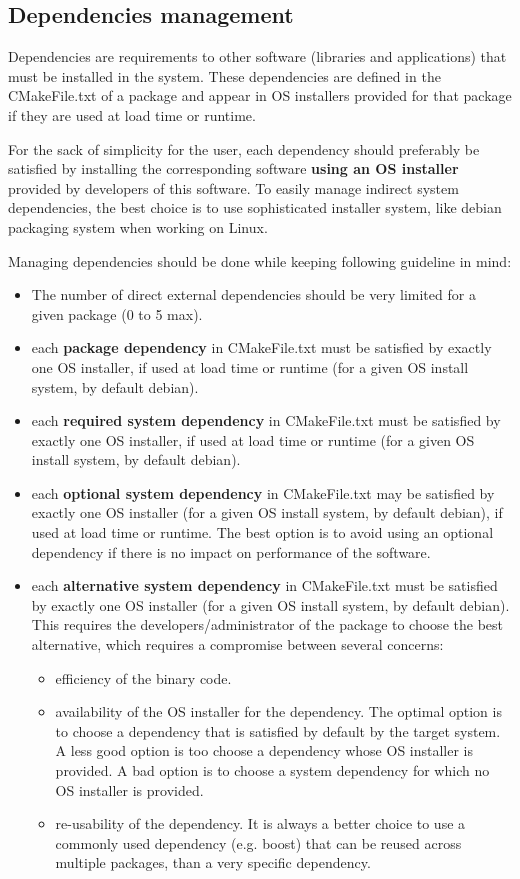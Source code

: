 \documentclass[12pt,a4paper]{article}
\begin{document}
\subsection{Dependencies management}

Dependencies are requirements to other software (libraries and applications) that must be installed in the system. These dependencies are defined in the CMakeFile.txt of a package and appear in OS installers provided for that package if they are used at load time or runtime. 

For the sack of simplicity for the user, each dependency should preferably be satisfied by installing the corresponding software \textbf{using an OS installer} provided by developers of this software. To easily manage indirect system dependencies, the best choice is to use sophisticated installer system, like debian packaging system when working on Linux.

Managing dependencies should be done while keeping following guideline in mind:
\begin{itemize}
\item The number of direct external dependencies should be very limited for a given package (0 to 5 max).
\item each \textbf{package dependency} in CMakeFile.txt must be satisfied by exactly one OS installer, if used at load time or runtime (for a given OS install system, by default debian).
\item each \textbf{required system dependency} in CMakeFile.txt must be satisfied by exactly one OS installer, if used at load time or runtime (for a given OS install system, by default debian).
\item each \textbf{optional system dependency} in CMakeFile.txt may be satisfied by exactly one OS installer (for a given OS install system, by default debian), if used at load time or runtime. The best option is to avoid using an optional dependency if there is no impact on performance of the software.
\item each \textbf{alternative system dependency} in CMakeFile.txt must be satisfied by exactly one OS installer (for a given OS install system, by default debian). This requires the developers/administrator of the package to choose the best alternative, which requires a compromise between several concerns:
\begin{itemize}
\item efficiency of the binary code. 
\item availability of the OS installer for the dependency. The optimal option is to choose a dependency that is satisfied by default by the target system. A less good option is too choose a dependency whose OS installer is provided. A bad option is to choose a system dependency for which no OS installer is provided.
\item re-usability of the dependency. It is always a better choice to use a commonly used dependency (e.g. boost) that can be reused across multiple packages, than a very specific dependency.
\end{itemize}
\end{itemize}
\end{document}
